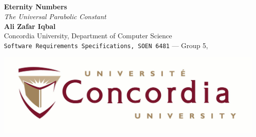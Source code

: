 \documentclass[30pt,a0,portrait]{a0poster}
\begin{document}

\\\\\\\
\noindent\begin{minipage}[b]{0.75\linewidth}
\veryHuge \color{Maroon} \textbf{Eternity Numbers} \color{Black}\\ %
\Huge\textit{The Universal Parabolic Constant}\\[2cm] %
\huge \textbf{Ali Zafar Iqbal}\\[0.5cm] %
\huge Concordia University, Department of Computer Science\\[0.4cm] %
\Large \texttt{Software Requirements Specifications, SOEN 6481} --- Group 5,\\
\end{minipage}
%
\begin{minipage}[b]{0.8\linewidth}
\includegraphics[scale=0.3]{figures/concordia.jpg}
\end{minipage}

\vspace{5cm} %

\end{document}
